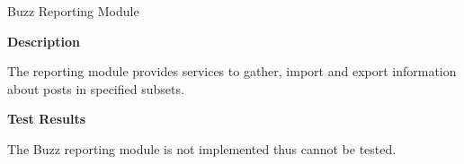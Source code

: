 \item Buzz Reporting Module

\textbf{Description}
	
The reporting module provides services to gather, import and export information about posts in
specified subsets.


\textbf{Test Results}

The Buzz reporting module is not implemented thus cannot be tested.